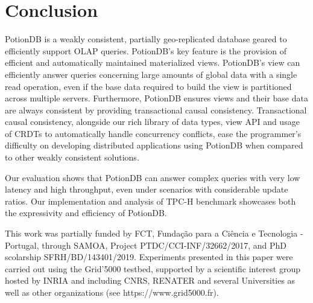 \documentclass[sigconf, nonacm]{acmart}
\begin{document}

\section{Conclusion}
\label{sec:conclusion}

PotionDB is a weakly consistent, partially geo-replicated database geared to efficiently support OLAP queries.
PotionDB’s key feature is the provision of efficient and automatically maintained materialized views.
PotionDB’s view can efficiently answer queries concerning large amounts of global data with a single read operation, even if the base data required to build the view is partitioned across multiple servers.
Furthermore, PotionDB ensures views and their base data are always consistent by providing transactional causal consistency.
Transactional causal consistency, alongside our rich library of data types, view API and usage of CRDTs to automatically handle concurrency conflicts, ease the programmer’s difficulty on developing distributed applications using PotionDB when compared to other weakly consistent solutions.

Our evaluation shows that PotionDB can answer complex queries with very low latency and high throughput, even under scenarios with considerable update ratios.
Our implementation and analysis of TPC-H benchmark showcases both the expressivity and efficiency of PotionDB.


\begin{acks}
This work was partially funded by FCT, Fundação para a Ciência e Tecnologia - Portugal, through SAMOA, Project PTDC/CCI-INF/32662/2017, and PhD scolarship SFRH/BD/143401/2019.
Experiments presented in this paper were carried out using the Grid'5000 testbed, supported by a scientific interest group hosted by INRIA and including CNRS, RENATER and several Universities as well as other organizations (see https://www.grid5000.fr).
\end{acks}




\balance

%


\end{document}
